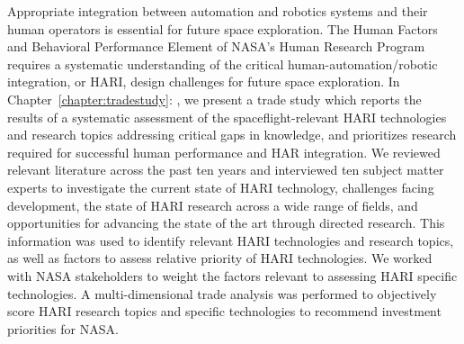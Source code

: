 Appropriate integration between automation and robotics systems and their human operators is essential for future space exploration.
The Human Factors and Behavioral Performance Element of NASA's Human Research Program requires a systematic understanding of the critical human-automation/robotic integration, or HARI, design challenges for future space exploration.
In Chapter~\ref{chapter:tradestudy}: , we present a trade study which reports the results of a systematic assessment of the spaceflight-relevant HARI technologies and research topics addressing critical gaps in knowledge, and prioritizes research required for successful human performance and HAR integration.
We reviewed relevant literature across the past ten years and interviewed ten subject matter experts to investigate the current state of HARI technology, challenges facing development, the state of HARI research across a wide range of fields, and opportunities for advancing the state of the art through directed research.
This information was used to identify relevant HARI technologies and research topics, as well as factors to assess relative priority of HARI technologies.
We worked with NASA stakeholders to weight the factors relevant to assessing HARI specific technologies.
A multi-dimensional trade analysis was performed to objectively score HARI research topics and specific technologies to recommend investment priorities for NASA.

